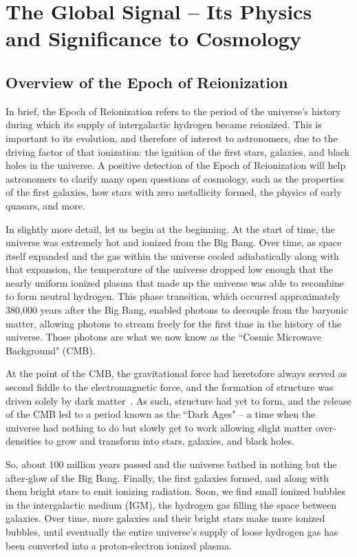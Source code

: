 \chapter{The Global Signal -- Its Physics and Significance to Cosmology}

\section{Overview of the Epoch of Reionization}

In brief, the Epoch of Reionization refers to the period of the universe's 
history during which its supply of intergalactic hydrogen became reionized.  
This is important to its evolution, and therefore of interest to astronomers, 
due to the driving factor of that ionization: the ignition of the first stars, 
galaxies, and black holes in the universe. A positive detection of the Epoch of 
Reionization will help astronomers to clarify many open questions of cosmology, 
such as the properties of the first galaxies, how stars with zero metallicity 
formed, the physics of early quasars, and more.

In slightly more detail, let us begin at the beginning. At the start of time, 
the universe was extremely hot and ionized from the Big Bang. Over time, as 
space itself expanded and the gas within the universe cooled adiabatically 
along with that expansion, the temperature of the universe dropped low enough 
that the nearly uniform ionized plasma that made up the universe was able to 
recombine to form neutral hydrogen. This phase transition, which occurred 
approximately 380,000 years after the Big Bang, enabled photons to decouple 
from the baryonic matter, allowing photons to stream freely for the first time 
in the history of the universe.  Those photons are what we now know as the 
``Cosmic Microwave Background" (CMB).

At the point of the CMB, the gravitational force had heretofore always served 
as second fiddle to the electromagnetic force, and the formation of structure 
was driven solely by dark matter~\citep{zaroubi2012}.  As such, structure had 
yet to form, and the release of the CMB led to a period known as the ``Dark 
Ages" -- a time when the universe had nothing to do but slowly get to work 
allowing slight matter over-densities to grow and transform into stars, 
galaxies, and black holes.

So, about 100 million years passed and the universe bathed in nothing but the 
after-glow of the Big Bang. Finally, the first galaxies formed, and along with 
them bright stars to emit ionizing radiation. Soon, we find small ionized 
bubbles in the intergalactic medium (IGM), the hydrogen gas filling the space 
between galaxies. Over time, more galaxies and their bright stars make more 
ionized bubbles, until eventually the entire universe's supply of loose 
hydrogen gas has been converted into a proton-electron ionized plasma.

